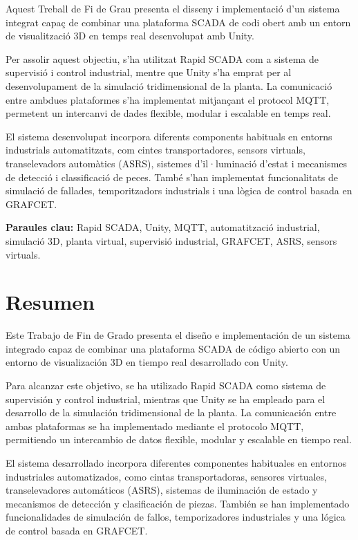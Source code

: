 \documentclass[a4paper,11pt,DIV=13,headings=normal,abstract=true,twoside=semi]{article}
\begin{document}
Aquest Treball de Fi de Grau presenta el disseny i implementació d'un sistema integrat capaç de combinar una plataforma SCADA de codi obert amb un entorn de visualització 3D en temps real desenvolupat amb Unity. 

Per assolir aquest objectiu, s'ha utilitzat Rapid SCADA com a sistema de supervisió i control industrial, mentre que Unity s'ha emprat per al desenvolupament de la simulació tridimensional de la planta. La comunicació entre ambdues plataformes s'ha implementat mitjançant el protocol MQTT, permetent un intercanvi de dades flexible, modular i escalable en temps real.

El sistema desenvolupat incorpora diferents components habituals en entorns industrials automatitzats, com cintes transportadores, sensors virtuals, transelevadors automàtics (ASRS), sistemes d'il·luminació d'estat i mecanismes de detecció i classificació de peces. També s'han implementat funcionalitats de simulació de fallades, temporitzadors industrials i una lògica de control basada en GRAFCET.


\bigskip

\textbf{Paraules clau:} Rapid SCADA, Unity, MQTT, automatització industrial, simulació 3D, planta virtual, supervisió industrial, GRAFCET, ASRS, sensors virtuals.



\section*{Resumen}

Este Trabajo de Fin de Grado presenta el diseño e implementación de un sistema integrado capaz de combinar una plataforma SCADA de código abierto con un entorno de visualización 3D en tiempo real desarrollado con Unity.

Para alcanzar este objetivo, se ha utilizado Rapid SCADA como sistema de supervisión y control industrial, mientras que Unity se ha empleado para el desarrollo de la simulación tridimensional de la planta. La comunicación entre ambas plataformas se ha implementado mediante el protocolo MQTT, permitiendo un intercambio de datos flexible, modular y escalable en tiempo real.

El sistema desarrollado incorpora diferentes componentes habituales en entornos industriales automatizados, como cintas transportadoras, sensores virtuales, transelevadores automáticos (ASRS), sistemas de iluminación de estado y mecanismos de detección y clasificación de piezas. También se han implementado funcionalidades de simulación de fallos, temporizadores industriales y una lógica de control basada en GRAFCET.
\end{document}

